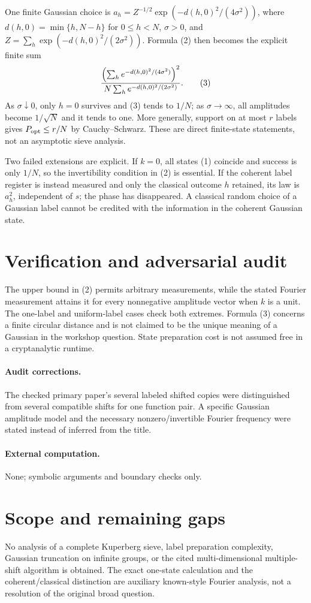 \documentclass[11pt]{article}
\begin{document}
One finite Gaussian choice is $a_h=Z^{-1/2}\exp(-d(h,0)^2/(4\sigma^2))$, where $d(h,0)=\min\{h,N-h\}$ for $0\leq h<N$, $\sigma>0$, and $Z=\sum_h\exp(-d(h,0)^2/(2\sigma^2))$. Formula (2) then becomes the explicit finite sum
\[
 {\left(\sum_he^{-d(h,0)^2/(4\sigma^2)}\right)^2
  \over N\sum_he^{-d(h,0)^2/(2\sigma^2)}}.                  \tag{3}
\]
As $\sigma\downarrow0$, only $h=0$ survives and (3) tends to $1/N$; as $\sigma\to\infty$, all amplitudes become $1/\sqrt N$ and it tends to one. More generally, support on at most $r$ labels gives $P_{\rm opt}\leq r/N$ by Cauchy--Schwarz. These are direct finite-state statements, not an asymptotic sieve analysis.

Two failed extensions are explicit. If $k=0$, all states (1) coincide and success is only $1/N$, so the invertibility condition in (2) is essential. If the coherent label register is instead measured and only the classical outcome $h$ retained, its law is $a_h^2$, independent of $s$; the phase has disappeared. A classical random choice of a Gaussian label cannot be credited with the information in the coherent Gaussian state.
\section{Verification and adversarial audit}
The upper bound in (2) permits arbitrary measurements, while the stated Fourier measurement attains it for every nonnegative amplitude vector when $k$ is a unit. The one-label and uniform-label cases check both extremes. Formula (3) concerns a finite circular distance and is not claimed to be the unique meaning of a Gaussian in the workshop question. State preparation cost is not assumed free in a cryptanalytic runtime.
\paragraph{Audit corrections.} The checked primary paper's several labeled shifted copies were distinguished from several compatible shifts for one function pair. A specific Gaussian amplitude model and the necessary nonzero/invertible Fourier frequency were stated instead of inferred from the title.
\paragraph{External computation.} None; symbolic arguments and boundary checks only.
\section{Scope and remaining gaps}
No analysis of a complete Kuperberg sieve, label preparation complexity, Gaussian truncation on infinite groups, or the cited multi-dimensional multiple-shift algorithm is obtained. The exact one-state calculation and the coherent/classical distinction are auxiliary known-style Fourier analysis, not a resolution of the original broad question.
\end{document}
